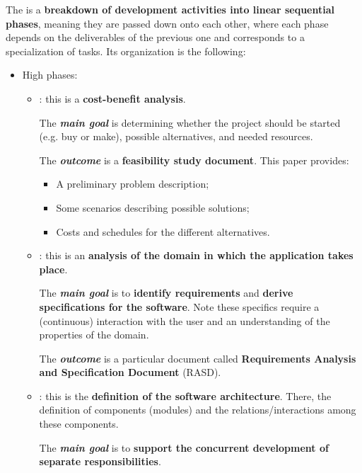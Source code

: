 The  is a \textbf{breakdown of development activities into linear sequential phases}, meaning they are passed down onto each other, where each phase depends on the deliverables of the previous one and corresponds to a specialization of tasks.\cite{bomarius2009product} Its organization is the following:
\begin{itemize}
    \item High phases:
    \begin{itemize}
        \item \underline{}: this is a \textbf{cost-benefit analysis}.
        
        The \textcolor{Red3}{\textbf{\emph{main goal}}} is determining whether the project should be started (e.g. buy or make), possible alternatives, and needed resources. 
        
        The \textcolor{Green4}{\textbf{\emph{outcome}}} is a \textbf{feasibility study document}. This paper provides:
        \begin{itemize}
            \item A preliminary problem description;
            \item Some scenarios describing possible solutions;
            \item Costs and schedules for the different alternatives.
        \end{itemize}


        \item \underline{}: this is an \textbf{analysis of the domain in which the application takes place}. 
        
        The \textcolor{Red3}{\textbf{\emph{main goal}}} is to \textbf{identify requirements} and \textbf{derive specifications for the software}. Note these specifics require a (continuous) interaction with the user and an understanding of the properties of the domain. 
        
        The \textcolor{Green4}{\textbf{\emph{outcome}}} is a particular document called \textbf{Requirements Analysis and Specification Document} (RASD).\label{RASD}


        \item \underline{}: this is the \textbf{definition of the software architecture}. There, the definition of components (modules) and the relations/interactions among these components. 
        
        The \textcolor{Red3}{\textbf{\emph{main goal}}} is to \textbf{support the concurrent development of separate responsibilities}. 
        

\end{itemize}
\end{itemize}
